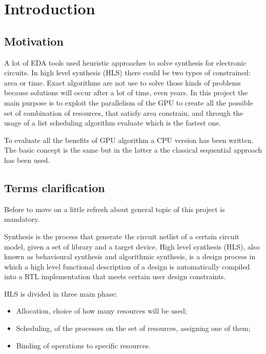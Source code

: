 %
\chapter{Introduction}
\label{chap1}

\section{Motivation}
A lot of EDA tools used heuristic approaches to solve synthesis for electronic circuits. In high level synthesis (HLS) there could be two types of constrained: area or time. Exact algorithms are not use to solve those kinds of problems because solutions will occur after a lot of time, even years. In this project the main purpose is to exploit the parallelism of the GPU to create all the possible set of combination of resources, that satisfy area constrain, and through the usage of a list scheduling algorithm evaluate which is the fastest one.

To evaluate all the benefits of GPU algorithm a CPU version has been written. The basic concept is the same but in the latter a the classical sequential approach has been used.

\section{Terms clarification}

Before to move on a little refresh about general topic of this project is mandatory.

Synthesis is the process that generate the circuit netlist of a certain circuit model, given a set of library and a target device. High level synthesis (HLS), also known as behavioural synthesis and algorithmic synthesis, is a design process in which a high level functional description of a design is automatically compiled into a RTL implementation that meets certain user design constraints. 

HLS is divided in three main phase:

\begin{itemize}
    \item Allocation, choice of how many resources will be used;
    \item Scheduling, of the processes on the set of resources, assigning one of them;
    \item Binding of operations to specific resources.
\end{itemize}{}

